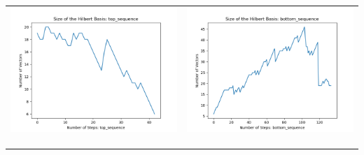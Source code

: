 \documentclass[10pt]{article}
\begin{document}
\begin{tabular}{c|c}
\begin{minipage}{.4\textwidth}
\includegraphics[width=\textwidth]{"DATA/4d/5 generators 2 bound G/top_sequence SIZE"}
\end{minipage} &
\begin{minipage}{.4\textwidth}
\includegraphics[width=\textwidth]{"DATA/4d/5 generators 2 bound G bottomup/bottom_sequence SIZE"}
\end{minipage} \\ \\
\hline \\\begin{minipage}{.4\textwidth}

\end{minipage}
\end{tabular}
\end{document}
